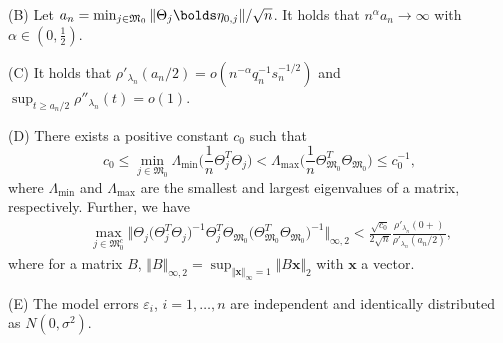 \documentclass[aos,MSNbibl,dvips]{arximspdf}
\def\sfrac#1#2{#1/#2}
\newcommand{\rrVert}{\Vert}
\newcommand{\llVert}{\Vert}
\newcommand{\bfeta}{\bolds\eta}
\newcommand{\Mfrak}{\mathfrak{M}}
\newcommand{\veps}{\varepsilon}
\begin{document}
\begin{appendix}
\begin{assumption}
(B) Let $a_n=\min_{j\in\Mfrak_0}\llVert \Theta_j\bfeta
_{0,j}\rrVert
/\sqrt{n}$. It holds that $n^{\alpha} a_n \rightarrow\infty$ with
$\alpha\in(0,\frac{1}{2})$.

(C) It holds that $\rho'_{\lambda_n}(a_n/2)=o (n^{-\alpha
}q_n^{-1}s_n^{-1/2} )$ and $\sup_{t\geq\sfrac{a_n}{2}}\rho
''_{\lambda_n}(t)=o(1)$.

(D) There exists a positive constant $c_0$ such that
%
\begin{equation}
\label{eqeigen} c_0\leq\min_{j\in\Mfrak_0}
\Lambda_{\min}\biggl(\frac{1}{n} \Theta_{j}^T
\Theta_{j}\biggr)<\Lambda_{\max}\biggl(\frac{1}{n}
\Theta_{\Mfrak_0}^T\Theta_{\Mfrak_0}\biggr)\leq
c_0^{-1},
\end{equation}
%
where $\Lambda_{\min}$ and $\Lambda_{\max}$
are the smallest and largest eigenvalues of a matrix, respectively.
Further, we have
%
\begin{eqnarray}
\label{e015}
&& \max_{j\in\Mfrak_0^c} \bigl\llVert\Theta_j
\bigl(\Theta_j^T\Theta_j
\bigr)^{-1}\Theta_j^T \Theta_{\Mfrak_0}
\bigl(\Theta_{\Mfrak_0}^T\Theta_{\Mfrak_0}
\bigr)^{-1} \bigr\rrVert_{\infty,
2}<\frac{\sqrt{c_0}}{2\sqrt{n}}
\frac{\rho'_{\lambda_n}(0+)}{\rho
'_{\lambda_n}(a_n/2)},%
\end{eqnarray}
%
where for a matrix $B$, $\llVert B\rrVert _{\infty,2} = \sup
_{\llVert {\mathbf x}\rrVert
_\infty=1}\llVert B{\mathbf x}\rrVert _2$ with ${\mathbf x}$ a vector.


(E) The model errors $\veps_i$, $i=1,\ldots, n$ are
independent and identically distributed as $N(0,\sigma^2)$.
\end{assumption}


\end{appendix}
\end{document}
